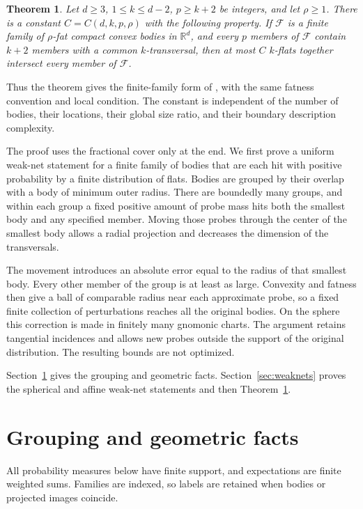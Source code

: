 \documentclass[11pt]{article}
\newtheorem{theorem}{Theorem}[section]
\theoremstyle{remark}
\newcommand{\R}{\mathbb R}
\begin{document}
\begin{theorem}
\label{thm:main}
Let \(d\geq3\), \(1\leq k\leq d-2\), \(p\geq k+2\) be integers,
and let \(\rho\geq1\).
There is a constant \(C=C(d,k,p,\rho)\) with the following property.
If \(\mathcal F\) is a finite family of \(\rho\)-fat compact convex bodies
in \(\R^d\), and every \(p\) members of \(\mathcal F\) contain \(k+2\)
members with a common \(k\)-transversal, then at most \(C\) \(k\)-flats
together intersect every member of \(\mathcal F\).
\end{theorem}

Thus the theorem gives the finite-family form of
\cite[Conjecture~1]{JP}, with the same fatness convention and local
condition. The constant is independent of the number of bodies, their
locations, their global size ratio, and their boundary description
complexity.

The proof uses the fractional cover only at the end. We first prove a
uniform weak-net statement for a finite family of bodies that are each
hit with positive probability by a finite distribution of flats.
Bodies are grouped by their overlap with a body of minimum outer radius.
There are boundedly many groups, and within each group a fixed
positive amount of probe mass hits both the smallest body and any
specified member. Moving those probes through the center of the smallest
body allows a radial projection and decreases the dimension of the
transversals.

The movement introduces an absolute error equal to the radius of that
smallest body. Every other member of the group is at least as large.
Convexity and fatness then give a ball of comparable radius near each
approximate probe, so a fixed finite collection of perturbations reaches
all the original bodies. On the sphere this correction is made in
finitely many gnomonic charts. The argument retains tangential
incidences and allows new probes outside the support of the original
distribution. The resulting bounds are not optimized.

Section~\ref{sec:geometry} gives the grouping and geometric facts.
Section~\ref{sec:weaknets} proves the spherical and affine weak-net
statements and then Theorem~\ref{thm:main}.

\section{Grouping and geometric facts}
\label{sec:geometry}

All probability measures below have finite support, and expectations
are finite weighted sums. Families are indexed, so labels are retained
when bodies or projected images coincide.
\end{document}
